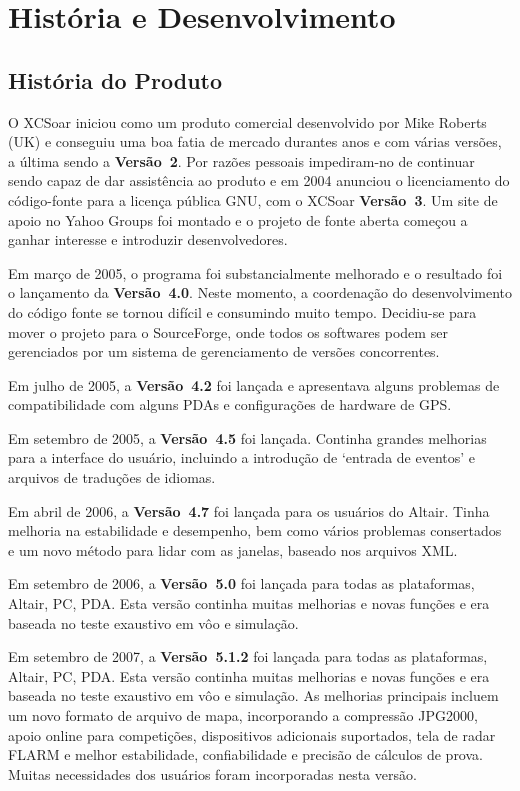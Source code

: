 \chapter{História e Desenvolvimento}\label{cha:history-development}


\section{História do Produto}

O XCSoar iniciou como um produto comercial desenvolvido por Mike Roberts (UK) e conseguiu uma boa fatia de mercado durantes anos e com várias versões, a última sendo a {\bf Versão~2}.
Por razões pessoais impediram-no de continuar sendo capaz de dar assistência ao produto e em 2004 anunciou o licenciamento do código-fonte para a licença pública GNU, com o XCSoar {\bf Versão~3}.  Um site de apoio no Yahoo Groups foi montado e o projeto de fonte aberta começou a ganhar interesse e introduzir desenvolvedores.

Em março de 2005, o programa foi substancialmente melhorado e o resultado foi o lançamento da {\bf Versão~4.0}.  Neste momento, a coordenação do desenvolvimento do código fonte se tornou difícil e consumindo muito tempo.  Decidiu-se para mover o projeto para o SourceForge, onde todos os softwares podem ser gerenciados por um sistema de gerenciamento de versões concorrentes.

Em julho de 2005, a {\bf Versão~4.2} foi lançada e apresentava alguns problemas de compatibilidade com alguns PDAs e configurações de hardware de GPS.

Em setembro de 2005, a {\bf Versão~4.5} foi lançada.  Continha grandes melhorias para a interface do usuário, incluindo a introdução de ‘entrada de eventos’ e arquivos de traduções de idiomas.

Em abril de 2006, a {\bf Versão~4.7} foi lançada para os usuários do Altair.  Tinha melhoria na estabilidade e desempenho, bem como vários problemas consertados e um novo método para lidar com as janelas, baseado nos arquivos XML.

Em setembro de 2006, a {\bf Versão~5.0} foi lançada para todas as plataformas, Altair, PC, PDA.  Esta versão continha muitas melhorias e novas funções e era baseada no teste exaustivo em vôo e simulação.

Em setembro de 2007, a {\bf Versão~5.1.2} foi lançada para todas as plataformas, Altair, PC, PDA.  Esta versão continha muitas melhorias e novas funções e era baseada no teste exaustivo em vôo e simulação.  As melhorias principais incluem um novo formato de arquivo de mapa, incorporando a compressão JPG2000, apoio online para competições, dispositivos adicionais suportados, tela de radar FLARM e melhor estabilidade, confiabilidade e precisão de cálculos de prova.  Muitas necessidades dos usuários foram incorporadas nesta versão.

